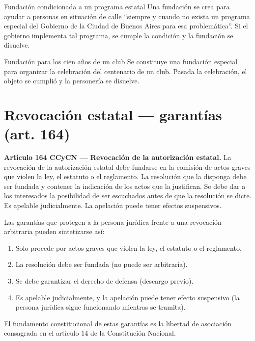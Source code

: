 \documentclass[12pt,oneside]{book}
\begin{document}
\begin{example}{Fundación condicionada a un programa estatal}
Una fundación se crea para ayudar a personas en situación de calle ``siempre y cuando no exista un programa especial del Gobierno de la Ciudad de Buenos Aires para esa problemática''. Si el gobierno implementa tal programa, se cumple la condición y la fundación se disuelve.
\end{example}

\begin{example}{Fundación para los cien años de un club}
Se constituye una fundación especial para organizar la celebración del centenario de un club. Pasada la celebración, el objeto se cumplió y la personería se disuelve.
\end{example}

\section{Revocación estatal --- garantías (art. 164)}

\begin{important}
\textbf{Artículo 164 CCyCN --- Revocación de la autorización estatal.} La revocación de la autorización estatal debe fundarse en la comisión de actos graves que violen la ley, el estatuto o el reglamento. La resolución que la disponga debe ser fundada y contener la indicación de los actos que la justifican. Se debe dar a los interesados la posibilidad de ser escuchados antes de que la resolución se dicte. Es apelable judicialmente. La apelación puede tener efectos suspensivos.
\end{important}

Las garantías que protegen a la persona jurídica frente a una revocación arbitraria pueden sintetizarse así:

\begin{enumerate}
    \item Solo procede por actos graves que violen la ley, el estatuto o el reglamento.
    \item La resolución debe ser fundada (no puede ser arbitraria).
    \item Se debe garantizar el derecho de defensa (descargo previo).
    \item Es apelable judicialmente, y la apelación puede tener efecto suspensivo (la persona jurídica sigue funcionando mientras se tramita).
\end{enumerate}

El fundamento constitucional de estas garantías es la libertad de asociación consagrada en el artículo 14 de la Constitución Nacional.
\end{document}
